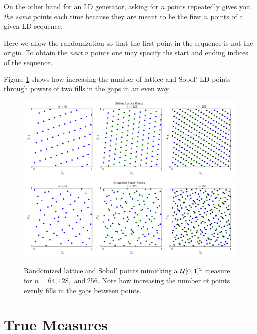 \documentclass[graybox,footinfo]{svmult}
\begin{document}
On the other hand for an LD generator, asking for $n$ points repeatedly gives you \emph{the same} points each time because they are meant to be the first $n$ points of a given LD sequence.  

Here we allow the randomization so that the first point in the sequence is not the origin.  To obtain the \emph{next} $n$ points one may specify the start and ending indices of the sequence.


Figure \ref{fig:increase_n} shows how increasing the number of lattice and Sobol' LD points through powers of two fills in the gaps in an even way.

\begin{figure}
	\includegraphics[width=1\textwidth]{QMCSoftwareArticle/figs/dd_lattice_successive.png}
	\qquad
	\includegraphics[width=1\textwidth]{QMCSoftwareArticle/figs/dd_sobol_successive.png}
	\caption{Randomized lattice and Sobol' points mimicking a ${\mathcal{U}}[0,1]^2$ measure for $n = 64, 128,$ and 256. Note how increasing the number of points evenly fills in the gaps between points.}
	\label{fig:increase_n}
\end{figure}

\section{True Measures}
\end{document}
